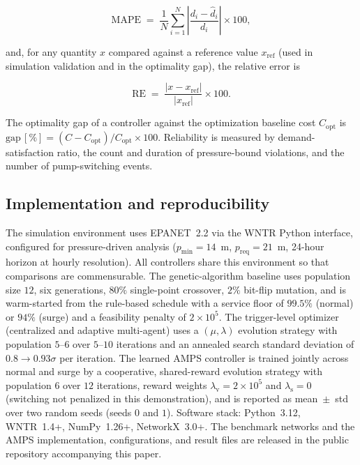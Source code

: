 \documentclass[11pt,a4paper]{article}
\begin{document}
\begin{equation}
\label{eq:mape}
\mathrm{MAPE} \;=\; \frac{1}{N}\sum_{i=1}^{N}
\left| \frac{d_i - \hat{d}_i}{d_i} \right| \times 100 ,
\end{equation}

and, for any quantity $x$ compared against a reference value $x_{\mathrm{ref}}$
(used in simulation validation and in the optimality gap), the relative error is

\begin{equation}
\label{eq:relerr}
\mathrm{RE} \;=\; \frac{\lvert x - x_{\mathrm{ref}} \rvert}{\lvert x_{\mathrm{ref}} \rvert}\times 100 .
\end{equation}

The optimality gap of a controller against the optimization baseline cost
$C_{\mathrm{opt}}$ is $\mathrm{gap}\,[\%] = (C - C_{\mathrm{opt}})/C_{\mathrm{opt}}\times 100$.
Reliability is measured by demand-satisfaction ratio, the count and duration of
pressure-bound violations, and the number of pump-switching events.

\subsection{Implementation and reproducibility}
The simulation environment uses EPANET~2.2 via the WNTR Python interface,
configured for pressure-driven analysis ($p_{\min}=14$~m, $p_{\mathrm{req}}=21$~m,
24-hour horizon at hourly resolution). All controllers share this environment so
that comparisons are commensurable. The genetic-algorithm baseline uses
population size $12$, six generations, $80\%$ single-point crossover, $2\%$
bit-flip mutation, and is warm-started from the rule-based schedule with a
service floor of $99.5\%$ (normal) or $94\%$ (surge) and a feasibility penalty
of $2{\times}10^{5}$. The trigger-level optimizer (centralized and adaptive
multi-agent) uses a $(\mu,\lambda)$ evolution strategy with population $5$--$6$
over $5$--$10$ iterations and an annealed search standard deviation of
$0.8 \to 0.93\sigma$ per iteration. The learned AMPS controller is trained
jointly across normal and surge by a cooperative, shared-reward evolution
strategy with population $6$ over $12$ iterations, reward weights
$\lambda_{\mathrm{v}}=2\times10^{5}$ and $\lambda_{\mathrm{s}}=0$ (switching not
penalized in this demonstration), and is reported as mean~$\pm$~std over two
random seeds (seeds $0$ and $1$). Software stack: Python~3.12, WNTR~1.4+,
NumPy~1.26+, NetworkX~3.0+. The benchmark networks and the AMPS implementation,
configurations, and result files are released in the public repository
accompanying this paper.
\end{document}
